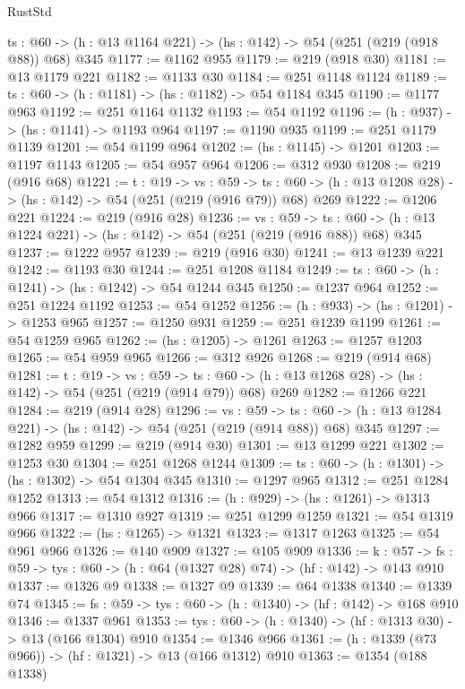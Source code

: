 \begin{lexlean}{RustStd}
\begin{coremodule}
{\begin{coremodule}
{{{{  {ts : @60} -> (h : @13 @1164 @221) -> (hs : @142) -> @54 (@251 (@219 (@918 @88)) @68) @345
@1177 := @1162 @955
@1179 := @219 (@918 @30)
@1181 := @13 @1179 @221
@1182 := @1133 @30
@1184 := @251 @1148 @1124
@1189 := {ts : @60} -> (h : @1181) -> (hs : @1182) -> @54 @1184 @345
@1190 := @1177 @963
@1192 := @251 @1164 @1132
@1193 := @54 @1192
@1196 := (h : @937) -> (hs : @1141) -> @1193 @964
@1197 := @1190 @935
@1199 := @251 @1179 @1139
@1201 := @54 @1199 @964
@1202 := (hs : @1145) -> @1201
@1203 := @1197 @1143
@1205 := @54 @957 @964
@1206 := @312 @930
@1208 := @219 (@916 @68)
@1221 := {t : @19} ->
  {vs : @59} ->
  {ts : @60} -> (h : @13 @1208 @28) -> (hs : @142) -> @54 (@251 (@219 (@916 @79)) @68) @269
@1222 := @1206 @221
@1224 := @219 (@916 @28)
@1236 := {vs : @59} ->
  {ts : @60} -> (h : @13 @1224 @221) -> (hs : @142) -> @54 (@251 (@219 (@916 @88)) @68) @345
@1237 := @1222 @957
@1239 := @219 (@916 @30)
@1241 := @13 @1239 @221
@1242 := @1193 @30
@1244 := @251 @1208 @1184
@1249 := {ts : @60} -> (h : @1241) -> (hs : @1242) -> @54 @1244 @345
@1250 := @1237 @964
@1252 := @251 @1224 @1192
@1253 := @54 @1252
@1256 := (h : @933) -> (hs : @1201) -> @1253 @965
@1257 := @1250 @931
@1259 := @251 @1239 @1199
@1261 := @54 @1259 @965
@1262 := (hs : @1205) -> @1261
@1263 := @1257 @1203
@1265 := @54 @959 @965
@1266 := @312 @926
@1268 := @219 (@914 @68)
@1281 := {t : @19} ->
  {vs : @59} ->
  {ts : @60} -> (h : @13 @1268 @28) -> (hs : @142) -> @54 (@251 (@219 (@914 @79)) @68) @269
@1282 := @1266 @221
@1284 := @219 (@914 @28)
@1296 := {vs : @59} ->
  {ts : @60} -> (h : @13 @1284 @221) -> (hs : @142) -> @54 (@251 (@219 (@914 @88)) @68) @345
@1297 := @1282 @959
@1299 := @219 (@914 @30)
@1301 := @13 @1299 @221
@1302 := @1253 @30
@1304 := @251 @1268 @1244
@1309 := {ts : @60} -> (h : @1301) -> (hs : @1302) -> @54 @1304 @345
@1310 := @1297 @965
@1312 := @251 @1284 @1252
@1313 := @54 @1312
@1316 := (h : @929) -> (hs : @1261) -> @1313 @966
@1317 := @1310 @927
@1319 := @251 @1299 @1259
@1321 := @54 @1319 @966
@1322 := (hs : @1265) -> @1321
@1323 := @1317 @1263
@1325 := @54 @961 @966
@1326 := @140 @909
@1327 := @105 @909
@1336 := {k : @57} ->
  {fs : @59} -> {tys : @60} -> (h : @64 (@1327 @28) @74) -> (hf : @142) -> @143 @910
@1337 := @1326 @9
@1338 := @1327 @9
@1339 := @64 @1338
@1340 := @1339 @74
@1345 := {fs : @59} -> {tys : @60} -> (h : @1340) -> (hf : @142) -> @168 @910
@1346 := @1337 @961
@1353 := {tys : @60} -> (h : @1340) -> (hf : @1313 @30) -> @13 (@166 @1304) @910
@1354 := @1346 @966
@1361 := (h : @1339 (@73 @966)) -> (hf : @1321) -> @13 (@166 @1312) @910
@1363 := @1354 (@188 @1338)
}}}}
\end{coremodule}}
\end{coremodule}
\end{lexlean}
